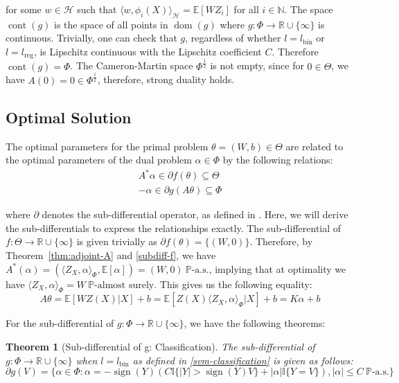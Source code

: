 \documentclass{article}
\newtheorem{theorem}{Theorem}
\begin{document}
for some $w \in \mathcal{H}$ such that $\langle w , \phi_i (X) \rangle_{\mathcal{H}} = \mathbb{E}[W Z_i]$ for all $i \in \mathbb{N}$. The space $\operatorname{cont}(g)$ is the space of all points in $\operatorname{dom}(g)$ where $g : \Phi \rightarrow \mathbb{R} \cup \{\infty\}$ is continuous. Trivially, one can check that $g$, regardless of whether $l = l_{\text{bin}}$ or $l = l_{\text{reg}}$, is Lipschitz continuous with the Lipschitz coefficient $C$. Therefore $\operatorname{cont}(g) = \Phi$. The Cameron-Martin space $\Phi^{\frac{1}{2}}$ is not empty, since for $0 \in \Theta$, we have $A(0) = 0 \in \Phi^{\frac{1}{2}}$, therefore, strong duality holds.

\subsection{Optimal Solution}

The optimal parameters for the primal problem $\theta = (W,b) \in \Theta$ are related to the optimal parameters of the dual problem $\alpha \in \Phi$ by the following relations:
\begin{align}
    A^{*}\alpha \in \partial f (\theta) \subseteq \Theta \label{subdiff-f}\\
    -\alpha \in \partial g (A\theta) \subseteq \Phi \label{subdiff-g}
\end{align}

where $\partial$ denotes the sub-differential operator, as defined in \cite[Section 4.2]{Borwein2005-ky}. Here, we will derive the sub-differentials to express the relationships exactly. The sub-differential of $f : \Theta \rightarrow \mathbb{R} \cup \{\infty\}$ is given trivially as $\partial f (\theta) = \{(W,0)\}$. Therefore, by Theorem~\ref{thm:adjoint-A} and \ref{subdiff-f}, we have $A^{*}(\alpha) = (\langle Z_X , \alpha \rangle_{\Phi} , \mathbb{E}[\alpha]) = (W,0) \ \mathbb{P}\text{-a.s.}$, implying that at optimality we have $\langle Z_X , \alpha \rangle_{\Phi} = W \ \mathbb{P}\text{-almost surely}$. This gives us the following equality:
\begin{equation}
A \theta = \mathbb{E}[W Z(X)|X] + b =\mathbb{E}[Z(X)\langle Z_X , \alpha \rangle_{\Phi}|X] + b = K\alpha + b
\end{equation}

For the sub-differential of $g : \Phi \rightarrow \mathbb{R} \cup \{\infty\}$, we have the following theorems:

\begin{theorem}[Sub-differential of g: Classification]\label{thm:subdiff-g-class}
The sub-differential of $g :\Phi \rightarrow \mathbb{R} \cup \{ \infty\}$ when $l = l_{\text{bin}}$ as defined in \ref{svm-classification} is given as follows:
\begin{equation}\label{classification-subdifferential}
\partial g(V) = \{\alpha \in \Phi : \alpha = -\operatorname{sign}(Y)(C\mathbb{I}\{|Y|>\operatorname{sign}(Y)V\} + |\alpha|\mathbb{I}\{Y=V\}), |\alpha| \leq C\ \mathbb{P}\text{-a.s.}\} 
\end{equation} 

\end{theorem}
\end{document}

